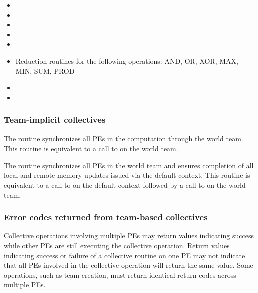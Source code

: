 \begin{DeprecateBlock}
\begin{itemize}
\item {}
\item {}
\item {}
\item {}
\item {}
\item Reduction routines for the following operations: AND, OR, XOR, MAX, MIN, SUM, PROD
\item {}
\item {}
\end{itemize}

\end{DeprecateBlock}


\subsubsection*{Team-implicit collectives}

The  routine synchronizes all \acp{PE} in the
computation through the world team. This routine is equivalent to a
call to  on the world team.

The  routine synchronizes all \acp{PE} in
the world team and ensures completion of all local and remote memory
updates issued via the default context.  This routine is equivalent to
a call to  on the default context followed by a
call to  on the world team.

\subsubsection*{Error codes returned from team-based collectives}

Collective operations involving multiple \acp{PE} may return values
indicating success while other \acp{PE} are still executing the
collective operation. Return values indicating success or failure of a
collective routine on one \ac{PE} may not indicate that all \acp{PE}
involved in the collective operation will return the same value. Some
operations, such as team creation, must return identical return codes
across multiple \acp{PE}.
